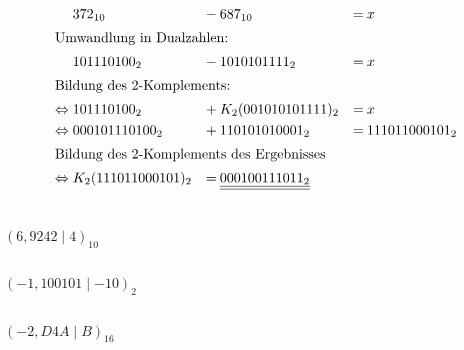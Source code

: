 \documentclass[10pt,a4paper,oneside,ngerman,numbers=noenddot]{scrartcl}
\begin{document}
\subsection{}
\begin{alignat}{3}
&\; 372_{10} &-&\: 687_{10} &=&\: x\\
\intertext{Umwandlung in Dualzahlen:}
&\; 101110100_{2} &-&\: 1010101111_{2} &=&\: x\\
\intertext{Bildung des 2-Komplements:}
\Leftrightarrow &\; 101110100_{2} &+&\: K_{2}(001010101111)_{2} &=&\: x\\
\Leftrightarrow &\; 000101110100_{2} &+&\: 110101010001_{2} &=&\: 111011000101_{2}\\
\intertext{Bildung des 2-Komplements des Ergebnisses}
\Leftrightarrow &\; K_{2}(111011000101)_{2} &=&\: \underline{\underline{000100111011_{2}}}
\end{alignat}
\section{}%
\subsection{}
$(6,9242 \mid 4)_{10}$
\subsection{}
$(-1,100101 \mid -10)_{2}$
\subsection{}
$(-2,D4A \mid B)_{16}$
\section{}%
\subsection{}
\end{document}
